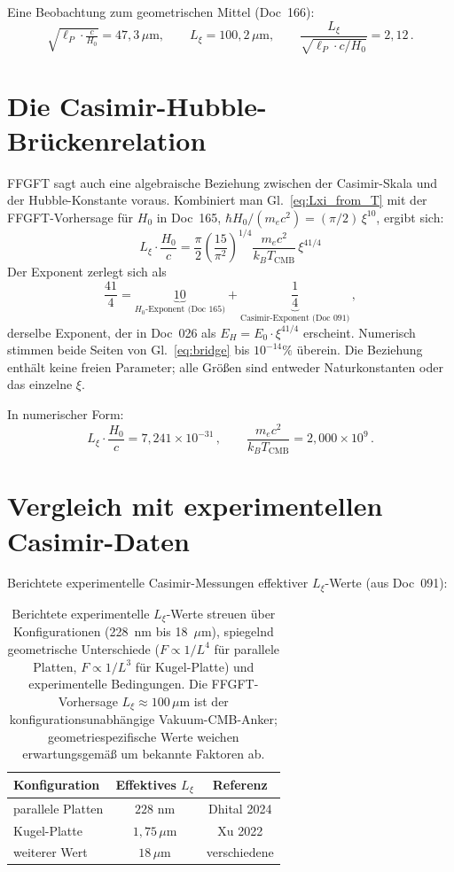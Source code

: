 \documentclass[11pt,a4paper]{article}
\begin{document}
Eine Beobachtung zum geometrischen Mittel (Doc~166):
\begin{equation}
\sqrt{\ell_P \cdot \tfrac{c}{H_0}} = 47{,}3\,\mu\text{m}, \qquad L_\xi = 100{,}2\,\mu\text{m}, \qquad \frac{L_\xi}{\sqrt{\ell_P \cdot c/H_0}} = 2{,}12\,.
\end{equation}

\section{Die Casimir-Hubble-Brückenrelation}

FFGFT sagt auch eine algebraische Beziehung zwischen der Casimir-Skala und der Hubble-Konstante voraus. Kombiniert man Gl.~\eqref{eq:Lxi_from_T} mit der FFGFT-Vorhersage für $H_0$ in Doc~165, $\hbar H_0 / (m_e c^2) = (\pi/2)\,\xi^{10}$, ergibt sich:
\begin{equation}
\boxed{\;L_\xi \cdot \frac{H_0}{c} = \frac{\pi}{2}\left(\frac{15}{\pi^2}\right)^{1/4} \frac{m_e c^2}{k_B T_{\mathrm{CMB}}}\,\xi^{41/4}\;}
\label{eq:bridge}
\end{equation}
Der Exponent zerlegt sich als
\[
\frac{41}{4} = \underbrace{10}_{H_0\text{-Exponent (Doc 165)}} + \underbrace{\frac{1}{4}}_{\text{Casimir-Exponent (Doc 091)}}\,,
\]
derselbe Exponent, der in Doc~026 als $E_H = E_0 \cdot \xi^{41/4}$ erscheint. Numerisch stimmen beide Seiten von Gl.~\eqref{eq:bridge} bis $10^{-14}\%$ überein. Die Beziehung enthält keine freien Parameter; alle Größen sind entweder Naturkonstanten oder das einzelne $\xi$.

In numerischer Form:
\begin{equation}
L_\xi \cdot \frac{H_0}{c} = 7{,}241 \times 10^{-31}\,, \qquad \frac{m_e c^2}{k_B T_{\mathrm{CMB}}} = 2{,}000 \times 10^9\,.
\end{equation}

\section{Vergleich mit experimentellen Casimir-Daten}

Berichtete experimentelle Casimir-Messungen effektiver $L_\xi$-Werte (aus Doc~091):

\begin{table}[h]
\centering
\small
\begin{tabular}{lcc}
\toprule
\textbf{Konfiguration} & \textbf{Effektives $L_\xi$} & \textbf{Referenz} \\
\midrule
parallele Platten & $228$ nm & Dhital 2024 \\
Kugel-Platte & $1{,}75\,\mu$m & Xu 2022 \\
weiterer Wert & $18\,\mu$m & verschiedene \\
\bottomrule
\end{tabular}
\caption{Berichtete experimentelle $L_\xi$-Werte streuen über Konfigurationen (228~nm bis 18~$\mu$m), spiegelnd geometrische Unterschiede ($F \propto 1/L^4$ für parallele Platten, $F \propto 1/L^3$ für Kugel-Platte) und experimentelle Bedingungen. Die FFGFT-Vorhersage $L_\xi \approx 100\,\mu$m ist der konfigurationsunabhängige Vakuum-CMB-Anker; geometriespezifische Werte weichen erwartungsgemäß um bekannte Faktoren ab.}
\end{table}
\end{document}

